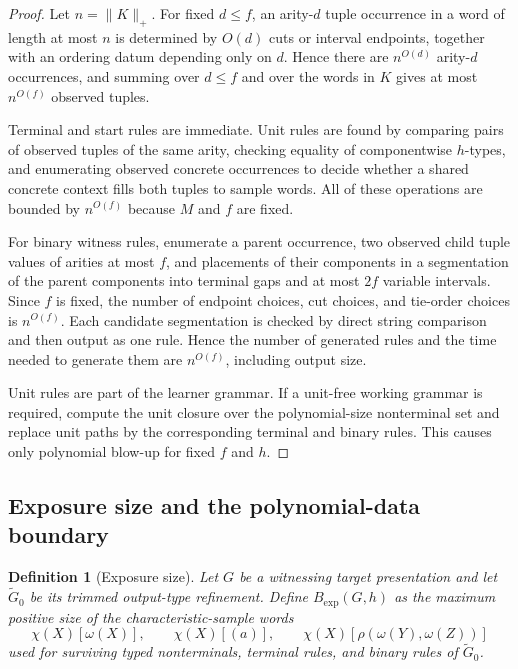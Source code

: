 \documentclass[11pt,a4paper]{article}
\newtheorem{definition}[theorem]{Definition}
\theoremstyle{remark}
\begin{document}
\begin{proof}
Let \(n=\|K\|_+\).  For fixed \(d\le f\), an arity-\(d\) tuple occurrence in a
word of length at most \(n\) is determined by \(O(d)\) cuts or interval endpoints,
together with an ordering datum depending only on \(d\).  Hence there are
\(n^{O(d)}\) arity-\(d\) occurrences, and summing over \(d\le f\) and over the
words in \(K\) gives at most \(n^{O(f)}\) observed tuples.

Terminal and start rules are immediate.  Unit rules are found by comparing
pairs of observed tuples of the same arity, checking equality of componentwise
\(h\)-types, and enumerating observed concrete occurrences to decide whether a
shared concrete context fills both tuples to sample words.  All of these
operations are bounded by \(n^{O(f)}\) because \(M\) and \(f\) are fixed.

For binary witness rules, enumerate a parent occurrence, two observed child
tuple values of arities at most \(f\), and placements of their components in a
segmentation of the parent components into terminal gaps and at most \(2f\)
variable intervals.  Since \(f\) is fixed, the
number of endpoint choices, cut choices, and tie-order choices is
\(n^{O(f)}\).  Each candidate segmentation is checked by direct string
comparison and then output as one rule.  Hence the number of generated rules
and the time needed to generate them are \(n^{O(f)}\), including output size.

Unit rules are part of the learner grammar.  If a unit-free working grammar is
required, compute the unit closure over the polynomial-size nonterminal set and
replace unit paths by the corresponding terminal and binary rules.  This causes
only polynomial blow-up for fixed \(f\) and \(h\).
\end{proof}

\subsection{Exposure size and the polynomial-data boundary}
\label{subsec:exposure-boundary}

\begin{definition}[Exposure size]
\label{def:exposure-size}
Let \(G\) be a witnessing target presentation and let \(\widetilde G_0\) be its
trimmed output-type refinement.  Define \(B_{\mathrm{exp}}(G,h)\) as the
maximum positive size of the characteristic-sample words
\[
  \chi(X)[\omega(X)],\qquad
  \chi(X)[(a)],\qquad
  \chi(X)[\rho(\omega(Y),\omega(Z))]
\]
used for surviving typed nonterminals, terminal rules, and binary rules of
\(\widetilde G_0\).
\end{definition}
\end{document}
